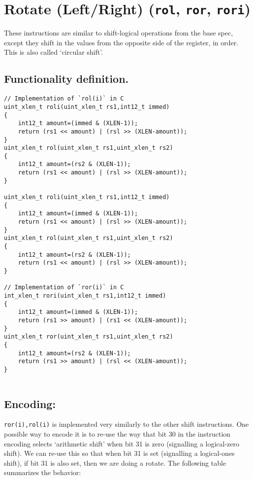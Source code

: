 \section{\texorpdfstring{Rotate (Left/Right) (\texttt{rol},
\texttt{ror},
\texttt{rori})}{Rotate (Left/Right) (rol, ror, rori)}}\label{rotate-leftright-rol-ror-rori}

These instructions are similar to shift-logical operations from the base
spec, except they shift in the values from the opposite side of the
register, in order. This is also called `circular shift'.

\subsection{Functionality
definition.}\label{functionality-definition.-3}

\begin{verbatim}
// Implementation of `rol(i)` in C
uint_xlen_t roli(uint_xlen_t rs1,int12_t immed)
{
    int12_t amount=(immed & (XLEN-1));
    return (rs1 << amount) | (rsl >> (XLEN-amount));
}
uint_xlen_t rol(uint_xlen_t rs1,uint_xlen_t rs2)
{
    int12_t amount=(rs2 & (XLEN-1));
    return (rs1 << amount) | (rsl >> (XLEN-amount));
}   

uint_xlen_t roli(uint_xlen_t rs1,int12_t immed)
{
    int12_t amount=(immed & (XLEN-1));
    return (rs1 << amount) | (rsl >> (XLEN-amount));
}
uint_xlen_t rol(uint_xlen_t rs1,uint_xlen_t rs2)
{
    int12_t amount=(rs2 & (XLEN-1));
    return (rs1 << amount) | (rsl >> (XLEN-amount));
}   

// Implementation of `ror(i)` in C
int_xlen_t rori(uint_xlen_t rs1,int12_t immed)
{
    int12_t amount=(immed & (XLEN-1));
    return (rs1 >> amount) | (rs1 << (XLEN-amount));
}
uint_xlen_t ror(uint_xlen_t rs1,uint_xlen_t rs2)
{
    int12_t amount=(rs2 & (XLEN-1));
    return (rs1 >> amount) | (rsl << (XLEN-amount));
}
   
\end{verbatim}

\subsection{Encoding:}\label{encoding-4}



\texttt{ror(i),rol(i)} is implemented very similarly to the other shift
instructions. One possible way to encode it is to re-use the way that
bit 30 in the instruction encoding selects `arithmetic shift' when bit
31 is zero (signalling a logical-zero shift). We can re-use this so that
when bit 31 is set (signalling a logical-ones shift), if bit 31 is also
set, then we are doing a rotate. The following table summarizes the
behavior:

